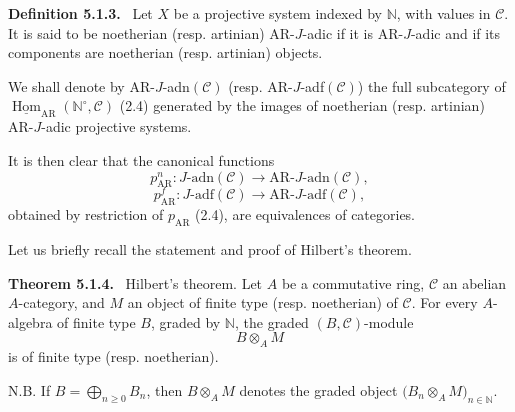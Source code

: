 \documentclass[11pt]{article}
\providecommand{\uHom}{\underline{\Hom}}
\newenvironment{statement}[1]{\par\medskip\noindent\textbf{#1.}\ }{\par\medskip}
\DeclareMathOperator{\Hom}{Hom}
\providecommand{\Hom}{\operatorname{Hom}}
\providecommand{\Hom}{\operatorname{Hom}}
\begin{document}
\begin{statement}{Definition 5.1.3}
Let \(X\) be a projective system indexed by \(\mathbb N\), with values in \(\mathcal C\). It is said to be noetherian (resp. artinian) AR-\(J\)-adic if it is AR-\(J\)-adic and if its components are noetherian (resp. artinian) objects.
\end{statement}

We shall denote by AR-\(J\)-adn\((\mathcal C)\) (resp. AR-\(J\)-adf\((\mathcal C)\)) the full subcategory of \(\uHom_{\mathrm{AR}}(\mathbb N^\circ,\mathcal C)\) (2.4) generated by the images of noetherian (resp. artinian) AR-\(J\)-adic projective systems.

It is then clear that the canonical functions
\[
p^n_{\mathrm{AR}}:J\text{-adn}(\mathcal C)\longrightarrow \mathrm{AR}\text{-}J\text{-adn}(\mathcal C),
\]
\[
p^f_{\mathrm{AR}}:J\text{-adf}(\mathcal C)\longrightarrow \mathrm{AR}\text{-}J\text{-adf}(\mathcal C),
\]
obtained by restriction of \(p_{\mathrm{AR}}\) (2.4), are equivalences of categories.

Let us briefly recall the statement and proof of Hilbert's theorem.

\begin{statement}{Theorem 5.1.4}
Hilbert's theorem. Let \(A\) be a commutative ring, \(\mathcal C\) an abelian \(A\)-category, and \(M\) an object of finite type (resp. noetherian) of \(\mathcal C\). For every \(A\)-algebra of finite type \(B\), graded by \(\mathbb N\), the graded \((B,\mathcal C)\)-module
\[
B\otimes_A M
\]
is of finite type (resp. noetherian).

N.B. If \(B=\bigoplus_{n\ge0}B_n\), then \(B\otimes_A M\) denotes the graded object \(\bigl(B_n\otimes_A M\bigr)_{n\in\mathbb N}\).
\end{statement}
\end{document}

